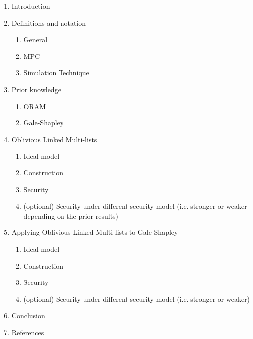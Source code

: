 \begin{enumerate}
  \item Introduction
  \item Definitions and notation
  \begin{enumerate}
    \item General
    \item MPC
    \item Simulation Technique
  \end{enumerate}
  \item Prior knowledge
  \begin{enumerate}
    \item ORAM
    \item Gale-Shapley
  \end{enumerate}
  \item Oblivious Linked Multi-lists
  \begin{enumerate}
  	\item Ideal model
    \item Construction
    \item Security
    \item \color{gray}(optional) Security under different security model (i.e. stronger or weaker depending on the prior results)
  \end{enumerate}
  \item Applying Oblivious Linked Multi-lists to Gale-Shapley
  \begin{enumerate}
    \item Ideal model
    \item Construction
    \item Security
    \item \color{gray}(optional) Security under different security model (i.e. stronger or weaker)
  \end{enumerate}
  \item Conclusion
  \item References
\end{enumerate}